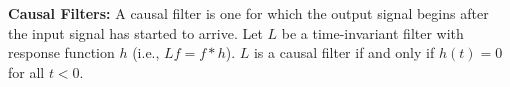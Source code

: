 {\bf Causal Filters:} A causal filter is one for which the output signal begins after the input signal has started to arrive. Let $L$ be a time-invariant filter with response function $h$ (i.e., $Lf=f*h$). $L$ is a causal filter if and only if $h(t)=0$ for all $t<0$.
